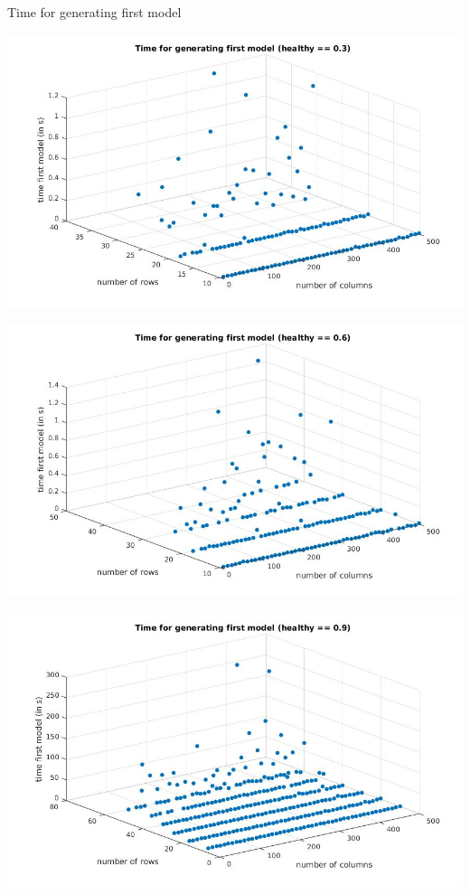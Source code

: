 \documentclass[10pt,dvipsnames]{beamer}
\begin{document}
\begin{frame}{Time for generating first model}
\begin{minipage}{0.5\textwidth}
\includegraphics[scale=0.2]{first_healthy03.jpg}
\end{minipage}
\begin{minipage}{0.4\textwidth}
\includegraphics[scale=0.2]{first_healthy06.jpg}
\end{minipage}
\begin{center}
\includegraphics[scale=0.2]{first_healthy09.jpg}
\end{center}
\end{frame}
\end{document}
